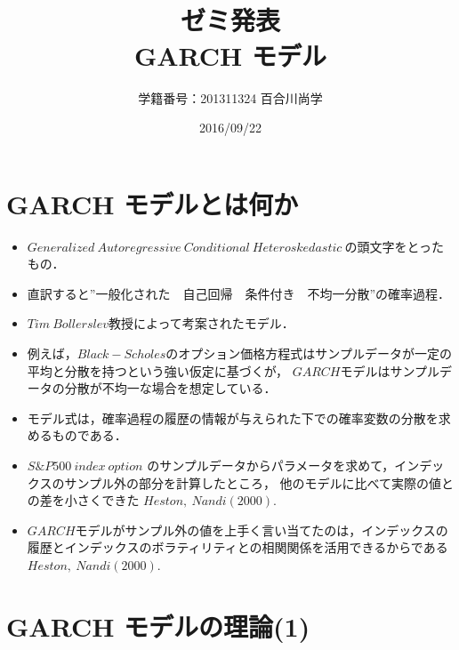 \documentclass[slide,10pt]{jsarticle}
\def\sheet #1{\section*{\centering \large \bfseries #1}}
\begin{document}
\title{\fontsize{45pt}{2cm}\selectfont \\ゼミ発表\\GARCH モデル\\}
\author{\Huge 学籍番号：201311324 百合川尚学}
\date{\Huge 2016/09/22}
\maketitle

\sheet{\Huge GARCH モデルとは何か}

{\huge
\begin{itemize}
	\vspace{5mm}
	\item $Generalized\ Autoregressive\ Conditional\ Heteroskedastic\ $の頭文字をとったもの．
	\vspace{5mm}
	\item 直訳すると''一般化された　自己回帰　条件付き　不均一分散''の確率過程．
	\vspace{5mm}
	\item $Tim\ Bollerslev$教授によって考案されたモデル．
	\vspace{5mm}
	\item 例えば，$Black-Scholes$のオプション価格方程式はサンプルデータが一定の平均と分散を持つという強い仮定に基づくが，
		$GARCH$モデルはサンプルデータの分散が不均一な場合を想定している．
	\vspace{5mm}
	\item モデル式は，確率過程の履歴の情報が与えられた下での確率変数の分散を求めるものである．
	\vspace{5mm}
	\item $S\&P500\ index\ option$ のサンプルデータからパラメータを求めて，インデックスのサンプル外の部分を計算したところ，
		他のモデルに比べて実際の値との差を小さくできた $Heston,\ Nandi (2000)$.
	\vspace{5mm}
	\item $GARCH$モデルがサンプル外の値を上手く言い当てたのは，インデックスの履歴とインデックスのボラティリティとの相関関係を活用できるからである $Heston,\ Nandi (2000)$.
\end{itemize}
}

\sheet{\Huge GARCH モデルの理論(1)}
\end{document}
